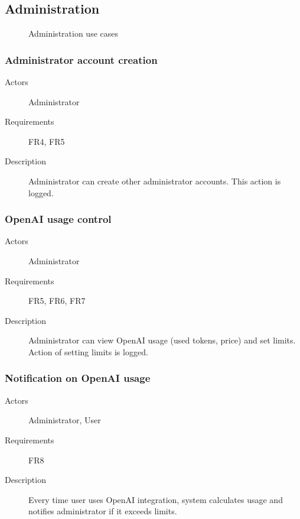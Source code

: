 \documentclass[
    english, %
]{VUMIFPSkursinis}
\begin{document}
\subsection{Administration}

\begin{figure}[ht]
    \centering
    
    \label{administration-use-cases}
    \caption{Administration use cases}
\end{figure}

\subsubsection{Administrator account creation}

\begin{description}
    \item[Actors] Administrator
    \item[Requirements] FR4, FR5
    \item[Description] Administrator can create other administrator accounts. This action is logged.
\end{description}

\subsubsection{OpenAI usage control}

\begin{description}
    \item[Actors] Administrator
    \item[Requirements] FR5, FR6, FR7
    \item[Description] Administrator can view OpenAI usage (used tokens, price) and set limits. Action of setting limits is logged.
\end{description}

\subsubsection{Notification on OpenAI usage}

\begin{description}
    \item[Actors] Administrator, User
    \item[Requirements] FR8
    \item[Description] Every time user uses OpenAI integration, system calculates usage and notifies administrator if it exceeds limits.
\end{description}
\end{document}
